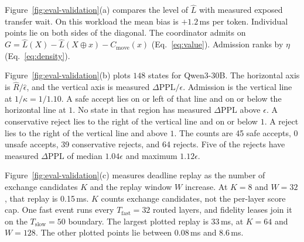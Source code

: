 Figure~\ref{fig:eval-validation}(a) compares the level of \(\widehat L\) with measured exposed transfer wait. On this workload the mean bias is \(+1.2\)\,ms per token. Individual points lie on both sides of the diagonal. The coordinator admits on \(G=\widehat L(X)-\widehat L(X\oplus x)-C_{\mathrm{move}}(x)\) (Eq.~\eqref{eq:value}). Admission ranks by \(\eta\) (Eq.~\eqref{eq:density}).

Figure~\ref{fig:eval-validation}(b) plots \(148\) states for Qwen3-30B. The horizontal axis is \(\widehat R/\widehat\epsilon\), and the vertical axis is measured \(\Delta\mathrm{PPL}/\epsilon\). Admission is the vertical line at \(1/\kappa=1/1.10\). A safe accept lies on or left of that line and on or below the horizontal line at \(1\). No state in that region has measured \(\Delta\mathrm{PPL}\) above \(\epsilon\). A conservative reject lies to the right of the vertical line and on or below \(1\). A reject lies to the right of the vertical line and above \(1\). The counts are 45 safe accepts, 0 unsafe accepts, 39 conservative rejects, and 64 rejects. Five of the rejects have measured \(\Delta\mathrm{PPL}\) of median \(1.04\epsilon\) and maximum \(1.12\epsilon\).

Figure~\ref{fig:eval-validation}(c) measures deadline replay as the number of exchange candidates \(K\) and the replay window \(W\) increase. At \(K=8\) and \(W=32\), that replay is 0.15\,ms. \(K\) counts exchange candidates, not the per-layer score cap. One fast event runs every \(T_{\mathrm{fast}}=32\) routed layers, and fidelity leases join it on the \(T_{\mathrm{slow}}=50\) boundary. The largest plotted replay is 33\,ms, at \(K=64\) and \(W=128\). The other plotted points lie between 0.08\,ms and 8.6\,ms.

